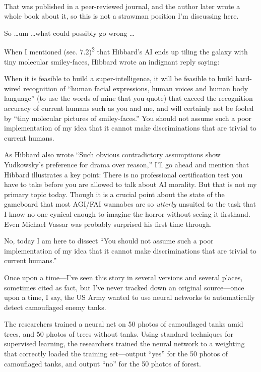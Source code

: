 \bigskip

{
 ~}

{
 That was published in a peer-reviewed journal, and the author
later wrote a whole book about it, so this is not a strawman position
I'm discussing here.}

{
 So \ldots um \ldots what could possibly go wrong \ldots}

{
 When I mentioned (sec. 7.2)\textsuperscript{2} that
Hibbard's AI ends up tiling the galaxy with tiny
molecular smiley-faces, Hibbard wrote an indignant reply saying:}

{
 When it is feasible to build a super-intelligence, it will be
feasible to build hard-wired recognition of ``human
facial expressions, human voices and human body
language'' (to use the words of mine that you quote)
that exceed the recognition accuracy of current humans such as you and
me, and will certainly not be fooled by ``tiny
molecular pictures of smiley-faces.'' You should not
assume such a poor implementation of my idea that it cannot make
discriminations that are trivial to current humans.}

{
 As Hibbard also wrote ``Such obvious
contradictory assumptions show Yudkowsky's preference
for drama over reason,'' I'll go
ahead and mention that Hibbard illustrates a key point: There is no
professional certification test you have to take before you are allowed
to talk about AI morality. But that is not my primary topic today.
Though it is a crucial point about the state of the gameboard that most
AGI/FAI wannabes are so \textit{utterly} unsuited to the task that I
know no one cynical enough to imagine the horror without seeing it
firsthand. Even Michael Vassar was probably surprised his first time
through.}

{
 No, today I am here to dissect ``You should not
assume such a poor implementation of my idea that it cannot make
discriminations that are trivial to current
humans.''}

{
 Once upon a time---I've seen this story in several
versions and several places, sometimes cited as fact, but
I've never tracked down an original source---once upon
a time, I say, the US Army wanted to use neural networks to
automatically detect camouflaged enemy tanks.}

{
 The researchers trained a neural net on 50 photos of camouflaged
tanks amid trees, and 50 photos of trees without tanks. Using standard
techniques for supervised learning, the researchers trained the neural
network to a weighting that correctly loaded the training set---output
``yes'' for the 50 photos of
camouflaged tanks, and output ``no''
for the 50 photos of forest.}

